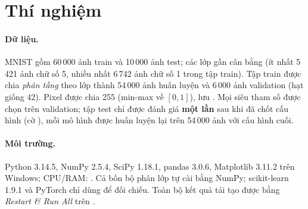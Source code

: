 \section{Thí nghiệm}\label{sec:exp}
 
\paragraph{Dữ liệu.} MNIST gồm 60\,000 ảnh train và 10\,000 ảnh test; các lớp gần cân bằng (ít nhất 5\,421 ảnh chữ số 5, nhiều nhất 6\,742 ảnh chữ số 1 trong tập train). Tập train được chia \emph{phân tầng} theo lớp thành 54\,000 ảnh huấn luyện và 6\,000 ảnh validation (hạt giống 42). Pixel được chia 255 (min-max về $[0,1]$), lưu . Mọi siêu tham số được chọn trên validation; tập test chỉ được đánh giá \textbf{một lần} sau khi đã chốt cấu hình (cờ ), mỗi mô hình được huấn luyện lại trên 54\,000 ảnh với cấu hình cuối.
 
\paragraph{Môi trường.} Python 3.14.5, NumPy 2.5.4, SciPy 1.18.1, pandas 3.0.6, Matplotlib 3.11.2 trên Windows; CPU/RAM: . Cả bốn bộ phân lớp tự cài bằng NumPy; scikit-learn 1.9.1 và PyTorch  chỉ dùng để đối chiếu. Toàn bộ kết quả tái tạo được bằng \emph{Restart \& Run All} trên .
 
